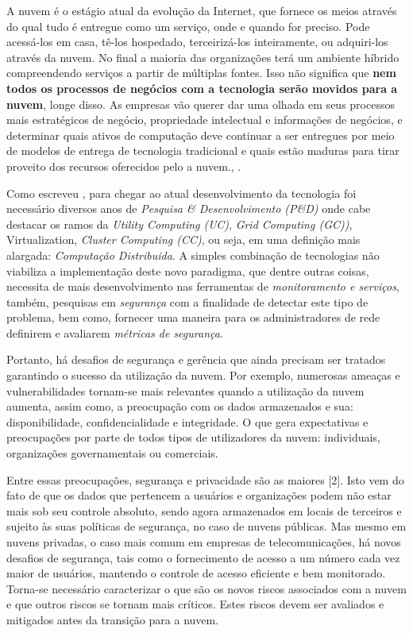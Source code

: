 \begin{citacao}
A nuvem é o estágio atual da evolução da Internet, que fornece os meios através
do qual tudo é entregue como um serviço, onde e quando for preciso. Pode
acessá-los em casa, tê-los hospedado, terceirizá-los inteiramente, ou
adquiri-los através da nuvem. No final a maioria das organizações terá um
ambiente híbrido compreendendo serviços a partir de múltiplas fontes. Isso não
significa que \textbf{nem todos os processos de negócios com a tecnologia serão
movidos para a nuvem}, longe disso. As empresas vão querer dar uma olhada em
seus processos mais estratégicos de negócio, propriedade intelectual e
informações de negócios, e determinar quais ativos de computação deve continuar
a ser entregues por meio de modelos de entrega de tecnologia tradicional e quais
estão maduras para tirar proveito dos recursos oferecidos pelo a nuvem.,
\cite[p.~3, grifo nosso]{Hurwitz2009}.
\end{citacao}

Como escreveu , para chegar ao atual desenvolvimento
da tecnologia foi necessário diversos anos de \textit{Pesquisa \&
Desenvolvimento (P\&D)} onde cabe destacar os ramos da \textit{Utility Computing
(UC)}, \textit{Grid Computing (GC))}, Virtualization, \textit{Cluster Computing
(CC)}, ou seja, em uma definição mais alargada: \emph{Computação Distribuida}. A
simples combinação de tecnologias não viabiliza a implementação deste novo
paradigma, que dentre outras coisas, necessita de mais desenvolvimento nas
ferramentas de \emph{monitoramento e serviços}, também, pesquisas em
\emph{segurança} com a finalidade de detectar este tipo de problema, bem como,
fornecer uma maneira para os administradores de rede definirem e avaliarem
\emph{métricas de segurança}.

Portanto, há desafios de segurança e gerência que ainda precisam ser tratados
garantindo o sucesso da utilização da nuvem. Por exemplo, numerosas ameaças e
vulnerabilidades tornam-se mais relevantes quando a utilização da nuvem aumenta,
assim como, a preocupação com os dados armazenados e sua:
\textsf{disponibilidade}, \textsf{confidencialidade} e \textsf{integridade}. O
que gera expectativas e preocupações por parte de todos tipos de utilizadores da
nuvem: individuais, organizações governamentais ou comerciais.


Entre essas preocupações, segurança e privacidade são as maiores [2]. Isto vem
do fato de que os dados que pertencem a usuários e organizações podem não estar
mais sob seu controle absoluto, sendo agora armazenados em locais de terceiros e
sujeito às suas políticas de segurança, no caso de nuvens públicas. Mas mesmo em
nuvens privadas, o caso mais comum em empresas de telecomunicações, há novos
desafios de segurança, tais como o fornecimento de acesso a um número cada vez
maior de usuários, mantendo o controle de acesso eficiente e bem monitorado.
Torna-se necessário caracterizar o que são os novos riscos associados com a
nuvem e que outros riscos se tornam mais críticos. Estes riscos devem ser
avaliados e mitigados antes da transição para a nuvem.

